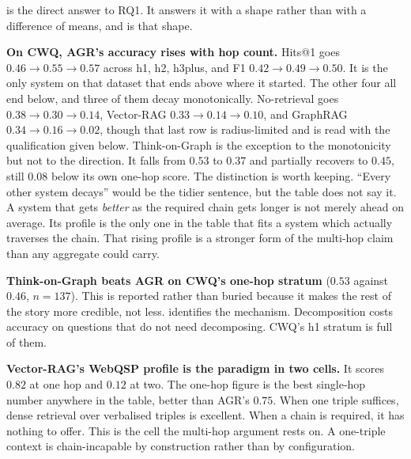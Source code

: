  is the direct answer to RQ1. It answers it with a shape rather
than with a difference of means, and  is that
shape.

\textbf{On CWQ, AGR's accuracy rises with hop count.} Hits@1 goes $0.46 \to 0.55
\to 0.57$ across \textsf{h1}, \textsf{h2}, \textsf{h3plus}, and F1 $0.42 \to
0.49 \to 0.50$. It is the only system on that dataset that ends above where it
started. The other four all end below, and three of them decay monotonically.
No-retrieval goes $0.38 \to 0.30 \to 0.14$, Vector-RAG $0.33 \to 0.14 \to 0.10$,
and GraphRAG $0.34 \to 0.16 \to 0.02$, though that last row is radius-limited
and is read with the qualification given below. Think-on-Graph is the exception
to the monotonicity but not to the direction. It falls from $0.53$ to $0.37$ and
partially recovers to $0.45$, still $0.08$ below its own one-hop score. The
distinction is worth keeping. ``Every other system decays'' would be the tidier
sentence, but the table does not say it. A system that gets \emph{better} as the
required chain gets longer is not merely ahead on average. Its profile is the
only one in the table that fits a system which actually traverses the chain.
That rising profile is a stronger form of the multi-hop claim than any aggregate
could carry.

\textbf{Think-on-Graph beats AGR on CWQ's one-hop stratum} ($0.53$ against
$0.46$, $n = 137$). This is reported rather than buried because it makes the
rest of the story more credible, not less.  identifies the
mechanism. Decomposition costs accuracy on questions that do not need
decomposing. CWQ's \textsf{h1} stratum is full of them.

\textbf{Vector-RAG's WebQSP profile is the paradigm in two cells.} It scores
$0.82$ at one hop and $0.12$ at two. The one-hop figure is the best single-hop
number anywhere in the table, better than AGR's $0.75$. When one triple
suffices, dense retrieval over verbalised triples is excellent. When a chain is
required, it has nothing to offer. This is the cell the multi-hop argument rests
on. A one-triple context is chain-incapable by construction rather than by
configuration.


